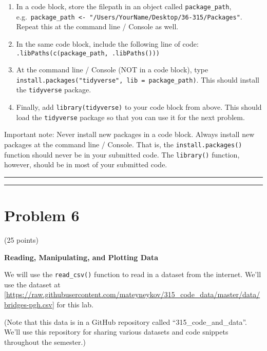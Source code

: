 \documentclass[]{article}
\begin{document}
\begin{enumerate}
\def\labelenumi{\alph{enumi}.}
\setcounter{enumi}{2}
\item
  In a code block, store the filepath in an object called
  \texttt{package\_path},
  e.g.~\texttt{package\_path\ \textless{}-\ "/Users/YourName/Desktop/36-315/Packages"}.
  Repeat this at the command line / Console as well.
\item
  In the same code block, include the following line of code:
  \texttt{.libPaths(c(package\_path,\ .libPaths()))}
\item
  At the command line / Console (NOT in a code block), type
  \texttt{install.packages("tidyverse",\ lib\ =\ package\_path)}. This
  should install the \texttt{tidyverse} package.
\item
  Finally, add \texttt{library(tidyverse)} to your code block from
  above. This should load the \texttt{tidyverse} package so that you can
  use it for the next problem.
\end{enumerate}

Important note: Never install new packages in a code block. Always
install new packages at the command line / Console. That is, the
\texttt{install.packages()} function should never be in your submitted
code. The \texttt{library()} function, however, should be in most of
your submitted code.

\begin{center}\rule{0.5\linewidth}{\linethickness}\end{center}

\begin{center}\rule{0.5\linewidth}{\linethickness}\end{center}

\hypertarget{problem-6}{%
\section{Problem 6}\label{problem-6}}

(25 points)

\textbf{Reading, Manipulating, and Plotting Data}

We will use the \texttt{read\_csv()} function to read in a dataset from
the internet. We'll use the dataset at
{[}\url{https://raw.githubusercontent.com/mateyneykov/315_code_data/master/data/bridges-pgh.csv}{]}
for this lab.

(Note that this data is in a GitHub repository called
``315\_code\_and\_data''. We'll use this repository for sharing various
datasets and code snippets throughout the semester.)
\end{document}
